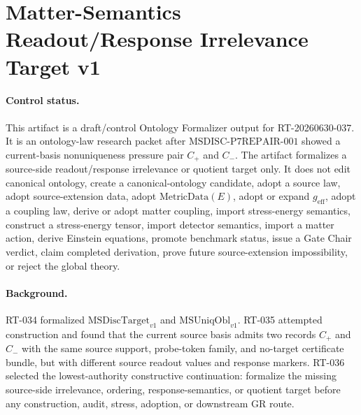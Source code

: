 \section*{Matter-Semantics Readout/Response Irrelevance Target v1}

\paragraph{Control status.}
This artifact is a draft/control Ontology Formalizer output for
RT-20260630-037.  It is an ontology-law research packet after
\(\mathrm{MSDISC\mbox{-}P7REPAIR\mbox{-}001}\) showed a current-basis
nonuniqueness pressure pair \(C_+\) and \(C_-\).  The artifact formalizes a
source-side readout/response irrelevance or quotient target only.  It does
not edit canonical ontology, create a canonical-ontology candidate, adopt a
source law, adopt source-extension data, adopt \(\mathrm{MetricData}(E)\),
adopt or expand \(g_{\mathrm{eff}}\), adopt a coupling law, derive or adopt
matter coupling, import stress-energy semantics, construct a stress-energy
tensor, import detector semantics, import a matter action, derive Einstein
equations, promote benchmark status, issue a Gate Chair verdict, claim
completed derivation, prove future source-extension impossibility, or reject
the global theory.

\paragraph{Background.}
RT-034 formalized \(\mathrm{MSDiscTarget}_{v1}\) and
\(\mathrm{MSUniqObl}_{v1}\).  RT-035 attempted construction and found that
the current source basis admits two records \(C_+\) and \(C_-\) with the same
source support, probe-token family, and no-target certificate bundle, but with
different source readout values and response markers.  RT-036 selected the
lowest-authority constructive continuation: formalize the missing source-side
irrelevance, ordering, response-semantics, or quotient target before any
construction, audit, stress, adoption, or downstream GR route.

\newcommand{\Bcur}{B_{\mathrm{cur}}}
\newcommand{\MSAdm}{\mathrm{MSAdm}_{v1}}
\newcommand{\MSDisc}{\mathrm{MSDiscTarget}_{v1}}
\newcommand{\MSUniq}{\mathrm{MSUniqObl}_{v1}}
\newcommand{\MSFail}{\mathrm{MatterSemanticsFailureObstruction}_{v1}}
\newcommand{\MSIrrelTarget}{\mathrm{MSIrrelTarget}_{v1}}
\newcommand{\MSIrrelLaw}{\mathrm{MSIrrelLaw}_{v1}}
\newcommand{\MSReadoutOrder}{\mathrm{MSReadoutOrder}_{v1}}
\newcommand{\MSRespSemLaw}{\mathrm{MSResponseSemanticsLaw}_{v1}}
\newcommand{\MSQuot}{\mathrm{MSSemanticsQuotient}_{v1}}
\newcommand{\NoTarget}{\mathrm{NoTargetImport}_{v1}}
\newcommand{\NoDetector}{\mathrm{NoDetectorImport}_{v1}}
\newcommand{\NoSE}{\mathrm{NoStressEnergyImport}_{v1}}
\newcommand{\NoAction}{\mathrm{NoMatterActionImport}_{v1}}
\newcommand{\MSIrrelEq}{\sim_{\mathrm{MSIrrel},E}}

